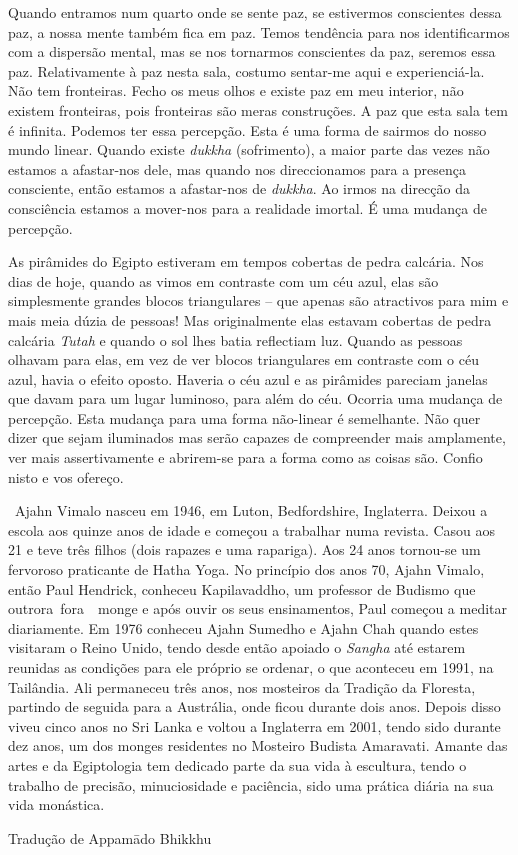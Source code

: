 Quando entramos num quarto onde se sente paz, se estivermos conscientes
dessa paz, a nossa mente também fica em paz. Temos tendência para nos
identificarmos com a dispersão mental, mas se nos tornarmos conscientes
da paz, seremos essa paz. Relativamente à paz nesta sala, costumo
sentar-me aqui e experienciá-la. Não tem fronteiras. Fecho os meus olhos
e existe paz em meu interior, não existem fronteiras, pois fronteiras
são meras construções. A paz que esta sala tem é infinita. Podemos ter
essa percepção. Esta é uma forma de sairmos do nosso mundo linear.
Quando existe \emph{dukkha} (sofrimento), a maior parte das vezes não
estamos a afastar-nos dele, mas quando nos direccionamos para a presença
consciente, então estamos a afastar-nos de \emph{dukkha}. Ao irmos na
direcção da consciência estamos a mover-nos para a realidade imortal. É
uma mudança de percepção.

As pirâmides do Egipto estiveram em tempos cobertas de pedra calcária.
Nos dias de hoje, quando as vimos em contraste com um céu azul, elas são
simplesmente grandes blocos triangulares -- que apenas são atractivos
para mim e mais meia dúzia de pessoas! Mas originalmente elas estavam
cobertas de pedra calcária \emph{Tutah} e quando o sol lhes batia
reflectiam luz. Quando as pessoas olhavam para elas, em vez de ver
blocos triangulares em contraste com o céu azul, havia o efeito oposto.
Haveria o céu azul e as pirâmides pareciam janelas que davam para um
lugar luminoso, para além do céu. Ocorria uma mudança de percepção. Esta
mudança para uma forma não-linear é semelhante. Não quer dizer que sejam
iluminados mas serão capazes de compreender mais amplamente, ver mais
assertivamente e abrirem-se para a forma como as coisas são. Confio
nisto e vos ofereço.

~Ajahn Vimalo nasceu em 1946, em Luton, Bedfordshire, Inglaterra. Deixou
a escola aos quinze anos de idade e começou a trabalhar numa revista.
Casou aos 21 e teve três filhos (dois rapazes e uma rapariga). Aos 24
anos tornou-se um fervoroso praticante de Hatha Yoga. No princípio dos
anos 70, Ajahn Vimalo, então Paul Hendrick, conheceu Kapilavaddho, um
professor de Budismo que outrora~fora~~monge e após ouvir os seus
ensinamentos, Paul começou a meditar diariamente. Em 1976 conheceu Ajahn
Sumedho e Ajahn Chah quando estes visitaram o Reino Unido, tendo desde
então apoiado o \emph{Sangha} até estarem reunidas as condições para ele
próprio se ordenar, o que aconteceu em 1991, na Tailândia. Ali
permaneceu três anos, nos mosteiros da Tradição da Floresta, partindo de
seguida para a Austrália, onde ficou durante dois anos. Depois disso
viveu cinco anos no Sri Lanka e voltou a Inglaterra em 2001, tendo sido
durante dez anos, um dos monges residentes no Mosteiro Budista
Amaravati. Amante das artes e da Egiptologia tem dedicado parte da sua
vida à escultura, tendo o trabalho de precisão, minuciosidade e
paciência, sido uma prática diária na sua vida monástica.

Tradução de Appamādo Bhikkhu

